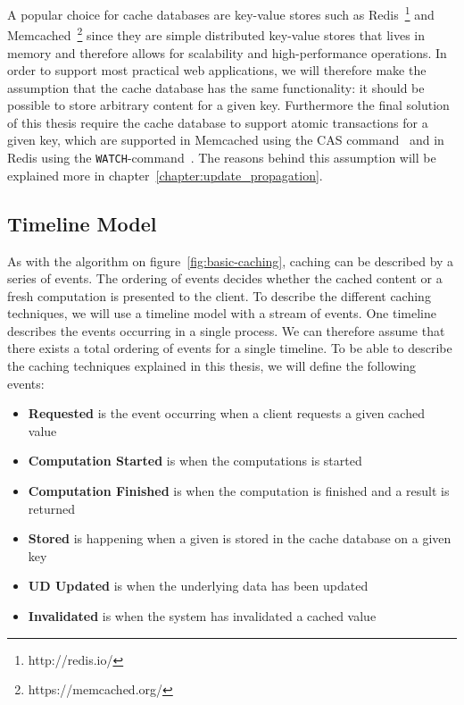A popular choice for cache databases are key-value stores such as Redis~\footnote{http://redis.io/} and Memcached~\footnote{https://memcached.org/} since they are simple distributed key-value stores that lives in memory and therefore allows for scalability and high-performance operations. In order to support most practical web applications, we will therefore make the assumption that the cache database has the same functionality: it should be possible to store arbitrary content for a given key. Furthermore the final solution of this thesis require the cache database to support atomic transactions for a given key, which are supported in Memcached using the CAS command~\cite{docs:memcached-protocol} and in Redis using the \verb$WATCH$-command~\cite{docs:redis-transactions}. The reasons behind this assumption will be explained more in chapter~\ref{chapter:update_propagation}.


\subsection{Timeline Model}
\label{subsec:timeline_model}

As with the algorithm on figure~\ref{fig:basic-caching}, caching can be described by a series of events. The ordering of events decides whether the cached content or a fresh computation is presented to the client. To describe the different caching techniques, we will use a timeline model with a stream of events. One timeline describes the events occurring in a single process. We can therefore assume that there exists a total ordering of events for a single timeline. To be able to describe the caching techniques explained in this thesis, we will define the following events:

\begin{itemize}
  \item \textbf{Requested} is the event occurring when a client requests a given cached value
  \item \textbf{Computation Started} is when the computations is started
  \item \textbf{Computation Finished} is when the computation is finished and a result is returned
  \item \textbf{Stored} is happening when a given is stored in the cache database on a given key
  \item \textbf{UD Updated} is when the underlying data has been updated
  \item \textbf{Invalidated} is when the system has invalidated a cached value
\end{itemize}

